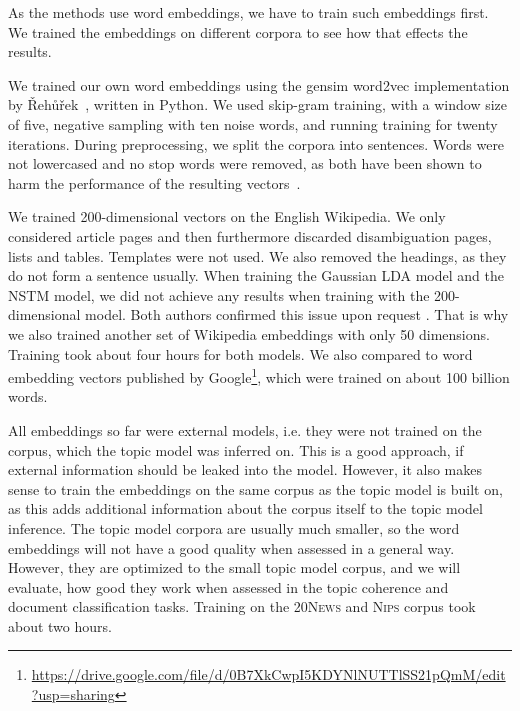 \documentclass[
        a4paper,
        titlepage,
        twoside,
        parskip
        ]{scrbook}
\theoremstyle{break}
\begin{document}
As the methods use word embeddings, we have to train such embeddings first.
We trained the embeddings on different corpora to see how that effects the results.

We trained our own word embeddings using the gensim word2vec implementation by {\v R}eh{\r u}{\v r}ek~\cite{Rehurek2010}, written in Python.
We used skip-gram training, with a window size of five, negative sampling with ten noise words, and running training for twenty iterations.
During preprocessing, we split the corpora into sentences.
Words were not lowercased and no stop words were removed, as both have been shown to harm the performance of the resulting vectors~\cite{Mikolov2013d}.

We trained 200-dimensional vectors on the English Wikipedia.
We only considered article pages and then furthermore discarded disambiguation pages, lists and tables.
Templates were not used.
We also removed the headings, as they do not form a sentence usually.
When training the Gaussian LDA model and the NSTM model, we did not achieve any results when training with the 200-dimensional model.
Both authors confirmed this issue upon request \cite{Das2016, Saeedi2016}.
That is why we also trained another set of Wikipedia embeddings with only 50 dimensions.
Training took about four hours for both models.
We also compared to word embedding vectors published by Google\footnote{\url{https://drive.google.com/file/d/0B7XkCwpI5KDYNlNUTTlSS21pQmM/edit?usp=sharing}}, which were trained on about 100 billion words.

All embeddings so far were external models, i.e. they were not trained on the corpus, which the topic model was inferred on.
This is a good approach, if external information should be leaked into the model.
However, it also makes sense to train the embeddings on the same corpus as the topic model is built on, as this adds additional information about the corpus itself to the topic model inference.
The topic model corpora are usually much smaller, so the word embeddings will not have a good quality when assessed in a general way.
However, they are optimized to the small topic model corpus, and we will evaluate, how good they work when assessed in the topic coherence and document classification tasks.
Training on the \textsc{20News} and \textsc{Nips} corpus took about two hours.
\end{document}

